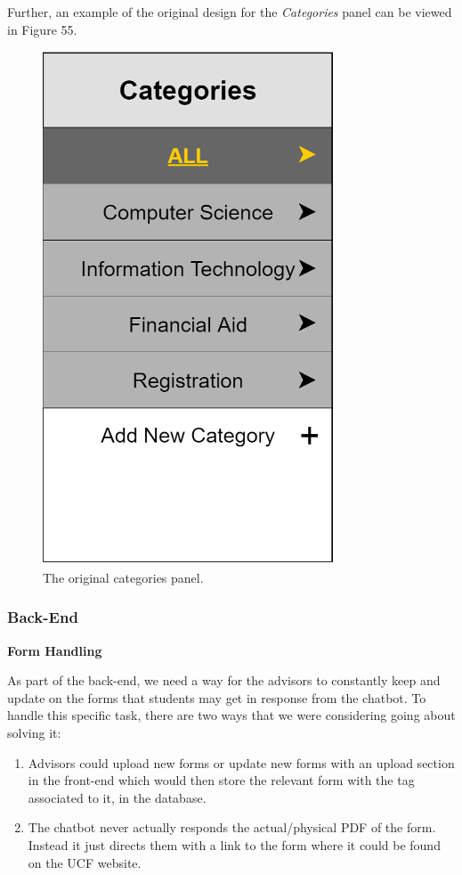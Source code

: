 \documentclass[titlepage, 12pt]{article}
\begin{document}
Further, an example of the original design for the \emph{Categories} panel can be viewed in Figure 55.

\begin{figure}[h]
    \centering\includegraphics[width=0.5\linewidth]{images/original-categories-panel.png}
    \caption{The original categories panel.}
\end{figure}

\subsubsection{Back-End}

\textbf{Form Handling}

As part of the back-end, we need a way for the advisors to constantly keep and update on the forms that students may get in response from the chatbot. To handle this specific task,  there are two ways that we were considering going about solving it:

\begin{enumerate}
    \item Advisors could upload new forms or update new forms with an upload section in the front-end which would then store the relevant form with the tag associated to it, in the database.
    \item The chatbot never actually responds the actual/physical PDF of the form. Instead it just directs them with a link to the form where it could be found on the UCF website.
\end{enumerate}
\end{document}
